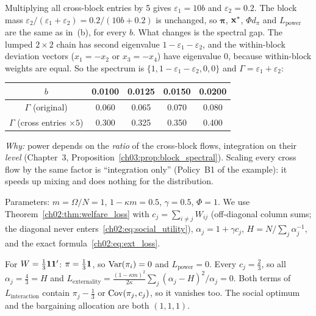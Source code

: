 \documentclass[../solutions_manual.tex]{subfiles}
\begin{document}
 Multiplying all cross-block entries by 5 gives $\varepsilon_1 = 10b$ and $\varepsilon_2 = 0.2$. The block mass $\varepsilon_2/(\varepsilon_1+\varepsilon_2) = 0.2/(10b + 0.2)$ is unchanged, so $\boldsymbol\pi$, $\mathbf{x}^*$, $\Phi d_\pi$ and $L_{\text{power}}$ are the same as in~(b), for every $b$. What changes is the spectral gap. The lumped $2\times2$ chain has second eigenvalue $1 - \varepsilon_1 - \varepsilon_2$, and the within-block deviation vectors ($x_1 = -x_2$ or $x_3 = -x_4$) have eigenvalue 0, because within-block weights are equal. So the spectrum is $\{1, 1 - \varepsilon_1 - \varepsilon_2, 0, 0\}$ and $\Gamma = \varepsilon_1 + \varepsilon_2$:
\begin{center}
\begin{tabular}{ccccc}
\toprule
$b$ & 0.0100 & 0.0125 & 0.0150 & 0.0200 \\
\midrule
$\Gamma$ (original) & 0.060 & 0.065 & 0.070 & 0.080 \\
$\Gamma$ (cross entries $\times5$) & 0.300 & 0.325 & 0.350 & 0.400 \\
\bottomrule
\end{tabular}
\end{center}
\emph{Why:} power depends on the \emph{ratio} of the cross-block flows, integration on their \emph{level} (Chapter~3, Proposition~\ref{ch03:prop:block_spectral}). Scaling every cross flow by the same factor is ``integration only'' (Policy~B1 of the example): it speeds up mixing and does nothing for the distribution.


Parameters: $m = \Omega/N = 1$, $1 - \kappa m = 0.5$, $\gamma = 0.5$, $\Phi = 1$. We use Theorem~\ref{ch02:thm:welfare_loss} with $c_j = \sum_{i\neq j}W_{ij}$ (off-diagonal column sums; the diagonal never enters~\eqref{ch02:eq:social_utility}), $\alpha_j = 1 + \gamma c_j$, $H = N/\sum_j\alpha_j^{-1}$, and the exact formula~\eqref{ch02:eq:ext_loss}.

 For $W = \frac13\mathbf{1}\mathbf{1}'$: $\pi = \frac13\mathbf{1}$, so $\operatorname{Var}(\pi_i) = 0$ and $L_{\text{power}} = 0$. Every $c_j = \frac23$, so all $\alpha_j = \frac43 = H$ and $L_{\text{externality}} = \frac{(1-\kappa m)^2}{2\kappa}\sum_j(\alpha_j - H)^2/\alpha_j = 0$. Both terms of $L_{\text{interaction}}$ contain $\pi_j - \frac13$ or $\operatorname{Cov}(\pi_j, c_j)$, so it vanishes too. The social optimum and the bargaining allocation are both $(1,1,1)$.
\end{document}
